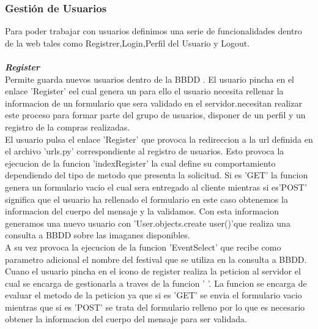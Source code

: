 \subsubsection{Gestión de Usuarios}
Para poder trabajar con usuarios definimos una serie de funcionalidades dentro de la web tales como Registrer,Login,Perfil del Usuario y Logout.
\\
\\\textbf{\textit{Register}}
\\Permite guarda nuevos usuarios dentro de la BBDD . El usuario pincha en el enlace 'Register' eel cual genera un para ello el usuario necesita rellenar la informacion de un formulario que sera validado en el servidor.necesitan realizar este proceso para formar parte del grupo de usuarios, disponer de un perfil y un registro de la compras realizadas.
\\El usuario pulsa el enlace 'Register' que provoca la redireccion a la url definida en el archivo 'urls.py' correspondiente al registro de usuarios. Esto provoca la ejecucion de la funcion 'indexRegister' la cual define su comportamiento dependiendo del tipo de metodo que presenta la solicitud. Si es 'GET' la funcion genera un formulario vacio el cual sera entregado al cliente mientras si es'POST' significa que el usuario ha rellenado el formulario en este caso obtenemos la informacion del cuerpo del mensaje y la validamos.
Con esta informacion generamos una  nuevo  usuario con 'User.objects.create user()'que realiza una consulta a BBDD sobre las imaganes disponibles.
\\A su vez provoca la ejecucion de la funcion 'EventSelect' que recibe como parametro adicional el nombre del festival que se utiliza en la consulta a BBDD.
\\Cuano el usuario pincha en el icono de register realiza la peticion al servidor el cual se encarga de gestionarla a traves de la funcion ' '. La funcion se encarga de evaluar el metodo de la peticion ya que si es 'GET'  se envia el formulario vacio mientras que si es 'POST'  se trata del  formulario relleno por lo que es necesario obtener la informacion del cuerpo del mensaje para ser validada.
\lstset{language=, breaklines=true, basicstyle=\footnotesize}
